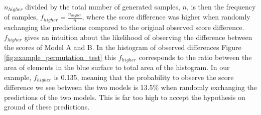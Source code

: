 $n_{higher}$ divided by the total number of generated samples, $n$, is then the frequency of samples, $f_{higher} = \frac{n_{higher}}{n}$, where the score difference was higher when randomly exchanging the predictions compared to the original observed score difference.
$f_{higher}$ gives an intuition about the likelihood of observing the difference between the scores of Model A and B.
In the histogram of observed differences Figure \ref{fig:example_permutation_test} \textbf{} this $f_{higher}$ corresponds to the ratio between the area of elements in the blue surface to total area of the histogram.
In our example, $f_{higher}$ is 0.135, meaning that the probability to observe the score difference we see between the two models is 13.5\% when randomly exchanging the predictions of the two models.
This is far too high to accept the hypothesis on ground of these predictions.


